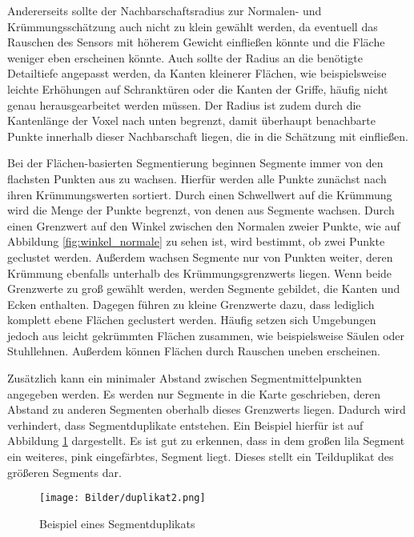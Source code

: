Andererseits sollte der Nachbarschaftsradius zur Normalen- und Krüm\-mungs\-schät\-zung auch nicht zu klein gewählt werden, da eventuell das Rauschen des Sensors mit höherem Gewicht einfließen könnte und die Fläche weniger eben erscheinen könnte. Auch sollte der Radius an die benötigte Detailtiefe angepasst werden, da Kanten kleinerer Flächen, wie beispielsweise leichte Erhöhungen auf Schranktüren oder die Kanten der Griffe, häufig nicht genau herausgearbeitet werden müssen. Der Radius ist zudem durch die Kantenlänge der Voxel nach unten begrenzt, damit überhaupt benachbarte Punkte innerhalb dieser Nachbarschaft liegen, die in die Schätzung mit einfließen.

Bei der Flächen-basierten Segmentierung beginnen Segmente immer von den flachsten Punkten aus zu wachsen. Hierfür werden alle Punkte zunächst nach ihren Krümmungswerten sortiert. Durch einen Schwellwert auf die Krümmung wird die Menge der Punkte begrenzt, von denen aus Segmente wachsen. Durch einen Grenzwert auf den Winkel zwischen den Normalen zweier Punkte, wie auf Abbildung \ref{fig:winkel_normale} zu sehen ist, wird bestimmt, ob zwei Punkte geclustet werden. Außerdem wachsen Segmente nur von Punkten weiter, deren Krümmung ebenfalls unterhalb des Krümmungsgrenzwerts liegen. Wenn beide Grenzwerte zu groß gewählt werden, werden Segmente gebildet, die Kanten und Ecken enthalten. Dagegen führen zu kleine Grenzwerte dazu, dass lediglich komplett ebene Flächen geclustert werden. Häufig setzen sich Umgebungen jedoch aus leicht gekrümmten Flächen zusammen, wie beispielsweise Säulen oder Stuhllehnen. Außerdem können Flächen durch Rauschen uneben erscheinen. 

%
%
Zusätzlich kann ein minimaler Abstand zwischen Segmentmittelpunkten angegeben werden. Es werden nur Segmente in die Karte geschrieben, deren Abstand zu anderen Segmenten oberhalb dieses Grenzwerts liegen. Dadurch wird verhindert, dass Segmentduplikate entstehen. Ein Beispiel hierfür ist auf Abbildung \ref{fig:Duplikat} dargestellt. Es ist gut zu erkennen, dass in dem großen lila Segment ein weiteres, pink eingefärbtes, Segment liegt. Dieses stellt ein Teilduplikat des größeren Segments dar.

\begin{figure}
	\centering
	\texttt{[image: Bilder/duplikat2.png]}
	\caption{Beispiel eines Segmentduplikats}
	\label{fig:Duplikat}
\end{figure}


